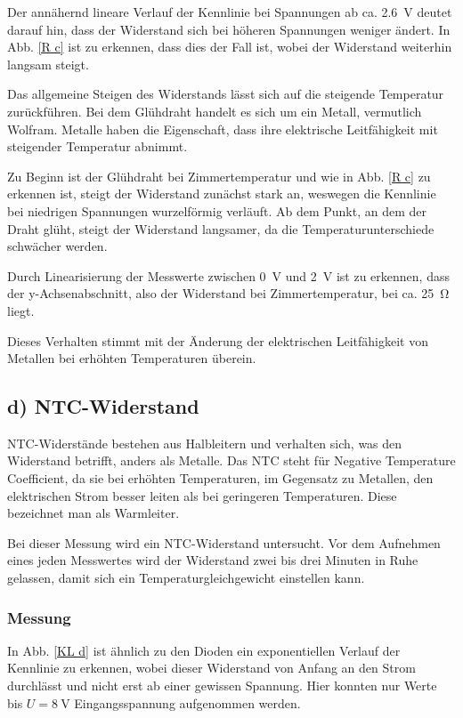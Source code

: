 \documentclass[11pt,a4paper,titlepage, ngerman]{article}
\begin{document}
				Der annähernd lineare Verlauf der Kennlinie bei Spannungen ab ca. \SI{2.6}{\volt} deutet darauf hin, dass der Widerstand sich bei höheren Spannungen weniger ändert.
				In Abb. \ref{R c} ist zu erkennen, dass dies der Fall ist, wobei der Widerstand weiterhin langsam steigt.
				
				Das allgemeine Steigen des Widerstands lässt sich auf die steigende Temperatur zurückführen.
				Bei dem Glühdraht handelt es sich um ein Metall, vermutlich Wolfram.
				Metalle haben die Eigenschaft, dass ihre elektrische Leitfähigkeit mit steigender Temperatur abnimmt.
				
				Zu Beginn ist der Glühdraht bei Zimmertemperatur und wie in Abb. \ref{R c} zu erkennen ist, steigt der Widerstand zunächst stark an, weswegen die Kennlinie bei niedrigen Spannungen wurzelförmig verläuft.
				Ab dem Punkt, an dem der Draht glüht, steigt der Widerstand langsamer, da die Temperaturunterschiede schwächer werden.
				
				Durch Linearisierung der Messwerte zwischen \SI{0}{\volt} und \SI{2}{\volt} ist zu erkennen, dass der y-Achsenabschnitt, also der Widerstand bei Zimmertemperatur, bei ca. \SI{25}{\ohm} liegt.
				
				Dieses Verhalten stimmt mit der Änderung der elektrischen Leitfähigkeit von Metallen bei erhöhten Temperaturen überein.
				
		\subsection{d) NTC-Widerstand} 
			
			NTC-Widerstände bestehen aus Halbleitern und verhalten sich, was den Widerstand betrifft, anders als Metalle.
			Das \glqq NTC\grqq{} steht für \glqq Negative Temperature Coefficient\grqq{}, da sie bei erhöhten Temperaturen, im Gegensatz zu Metallen, den elektrischen Strom besser leiten als bei geringeren Temperaturen. Diese bezeichnet man als Warmleiter.
			
			Bei dieser Messung wird ein NTC-Widerstand untersucht.
			Vor dem Aufnehmen eines jeden Messwertes wird der Widerstand zwei bis drei Minuten in Ruhe gelassen, damit sich ein Temperaturgleichgewicht einstellen kann.
			
			\subsubsection*{Messung}
			
				In Abb. \ref{KL d} ist ähnlich zu den Dioden ein exponentiellen Verlauf der Kennlinie zu erkennen, wobei dieser Widerstand von Anfang an den Strom durchlässt und nicht erst ab einer gewissen Spannung.
				Hier konnten nur Werte bis $U = \SI{8}{\volt}$ Eingangsspannung aufgenommen werden.
				
\end{document}
